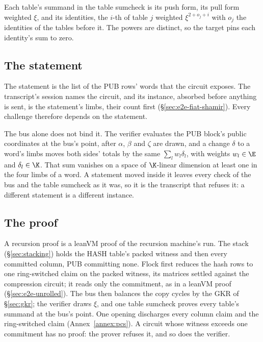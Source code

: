 Each table's summand in the table sumcheck is its push form, its pull form weighted $\xi$, and its identities, the $i$-th of table $j$ weighted $\xi^{2+o_j+i}$ with $o_j$ the identities of the tables before it. The powers are distinct, so the target pins each identity's sum to zero.

\subsection{The statement}\label{rec:statement}

The statement is the list of the \textsf{PUB} rows' words that the circuit exposes. The transcript's session names the circuit, and its instance, absorbed before anything is sent, is the statement's limbs, their count first (\S\ref{sec:e2e-fiat-shamir}). Every challenge therefore depends on the statement.

The bus alone does not bind it. The verifier evaluates the \textsf{PUB} block's public coordinates at the bus's point, after $\alpha$, $\beta$ and $\zeta$ are drawn, and a change $\delta$ to a word's limbs moves both sides' totals by the same $\sum_l w_l\delta_l$, with weights $w_l\in\E$ and $\delta_l\in\K$. That sum vanishes on a space of $\K$-linear dimension at least one in the four limbs of a word. A statement moved inside it leaves every check of the bus and the table sumcheck as it was, so it is the transcript that refuses it: a different statement is a different instance.

\subsection{The proof}\label{rec:proof}

A recursion proof is a leanVM proof of the recursion machine's run. The stack (\S\ref{sec:stacking}) holds the \textsf{HASH} table's packed witness and then every committed column, \textsf{PUB} committing none. Flock first reduces the hash rows to one ring-switched claim on the packed witness, its matrices settled against the compression circuit; it reads only the commitment, as in a leanVM proof (\S\ref{sec:e2e-unrolled}). The bus then balances the copy cycles by the GKR of \S\ref{sec:gkr}; the verifier draws $\xi$, and one table sumcheck proves every table's summand at the bus's point. One opening discharges every column claim and the ring-switched claim (Annex~\ref{annex:pcs}). A circuit whose witness exceeds one commitment has no proof: the prover refuses it, and so does the verifier.

